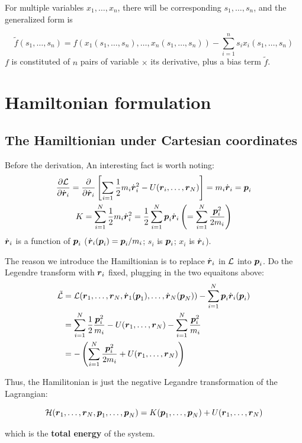 For multiple variables $x_1, \dots, x_n$, there will be corresponding $s_1, \dots, s_n$, and the generalized form is
\begin{tcolorbox}
	\begin{equation}
		\tilde{f}(s_1, \dots, s_n)=f(x_1(s_1, \dots, s_n),\dots,x_n(s_1, \dots, s_n))-\sum_{i=1}^{n}s_ix_i(s_1, \dots, s_n)
	\end{equation}
	$f$ is constituted of $n$ pairs of variable $\times$ its derivative, plus a bias term $\tilde{f}$.
\end{tcolorbox}

\section{Hamiltonian formulation}

\vspace{1em}
\subsection{The Hamiltionian under Cartesian coordinates}

Before the derivation, An interesting fact is worth noting:
\begin{gather}
	\dfrac{\partial \mathcal{L}}{\partial \dot{\boldsymbol{r}}_i}=\dfrac{\partial }{\partial \dot{\boldsymbol{r}}_i}\left[\sum_{i=1}\dfrac{1}{2} m_i\dot{\boldsymbol{r}}_i^2-U(\boldsymbol{r}_i,\dots,\boldsymbol{r}_N)\right]=m_i\dot{\boldsymbol{r}}_i=\boldsymbol{p}_i\\
	K=\sum_{i=1}^N\dfrac{1}{2} m_i\dot{\boldsymbol{r}}_i^2=\dfrac{1}{2}\sum_{i=1}^N\boldsymbol{p}_i\dot{\boldsymbol{r}}_i\left(=\sum_{i=1}^N\dfrac{\boldsymbol{p}_i^2}{2m_i}\right)
\end{gather}
$\dot{\boldsymbol{r}}_i$ is a function of $\boldsymbol{p}_i$ ($\dot{\boldsymbol{r}}_i(\boldsymbol{p}_i)=\boldsymbol{p}_i/m_i$; $s_i$ is $\boldsymbol{p}_i$; $x_i$ is $\dot{\boldsymbol{r}}_i$). 

The reason we introduce the Hamiltionian is to replace $\dot{\boldsymbol{r}}_i$ in $\mathcal{L}$ into $\boldsymbol{p}_i$. Do the Legendre transform with $\boldsymbol{r}_i$ fixed, plugging in the two equaitons above:
\begin{align}
	\tilde{\mathcal{L}}&=\mathcal{L}(\boldsymbol{r}_1,\dots,\boldsymbol{r}_N,\dot{\boldsymbol{r}}_1(\boldsymbol{p}_1),\dots,\dot{\boldsymbol{r}}_N(\boldsymbol{p}_N))-\sum_{i=1}^N \boldsymbol{p}_i\dot{\boldsymbol{r}}_i(\boldsymbol{p}_i) \notag\\
	&=\sum_{i=1}^N\dfrac{1}{2} \dfrac{\boldsymbol{p}_i^2}{m_i}-U(\boldsymbol{r}_1,\dots,\boldsymbol{r}_N)-\sum_{i=1}^N \dfrac{\boldsymbol{p}_i^2}{m_i} \notag\\
	&=-\left(\sum_{i=1}^N \dfrac{\boldsymbol{p}_i^2}{2m_i}+U(\boldsymbol{r}_1,\dots,\boldsymbol{r}_N)\right)
\end{align}

Thus, the Hamilitonian is just the negative Legandre transformation of the Lagrangian:
\begin{tcolorbox}
	\begin{equation}
		\mathcal{H}(\boldsymbol{r}_1,\dots,\boldsymbol{r}_N,\boldsymbol{p}_1,\dots,\boldsymbol{p}_N)=K(\boldsymbol{p}_1,\dots,\boldsymbol{p}_N)+U(\boldsymbol{r}_1,\dots,\boldsymbol{r}_N)
	\end{equation}
\end{tcolorbox}
which is the \textbf{total energy} of the system.

